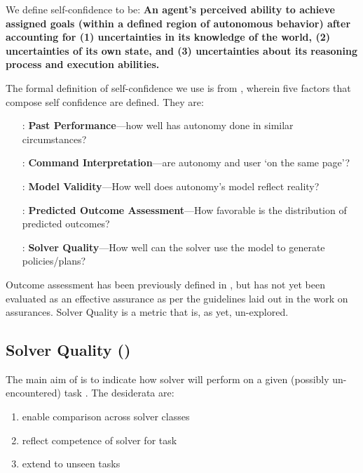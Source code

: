     We define self-confidence to be: \textbf{An agent's perceived ability to achieve assigned goals (within a defined region of autonomous behavior) after accounting for (1) uncertainties in its knowledge of the world, (2) uncertainties of its own state, and (3) uncertainties about its reasoning process and execution abilities.}

    The formal definition of self-confidence we use is from \cite{Aitken2016-cv}, wherein five factors that compose self confidence are defined. They are:

        \begin{itemize}
            \item [\xH{}:] \textbf{Past Performance}---how well has autonomy done in similar circumstances?
            \item [\xI{}:] \textbf{Command Interpretation}---are autonomy and user `on the same page'?
            \item [\xM{}:] \textbf{Model Validity}---How well does autonomy's model reflect reality?
            \item [\xP{}:] \textbf{Predicted Outcome Assessment}---How favorable is the distribution of predicted outcomes?
            \item [\xQ{}:] \textbf{Solver Quality}---How well can the solver use the model to generate policies/plans?
        \end{itemize}

    Outcome assessment has been previously defined in \cite{Aitken2016-cv}, but has not yet been evaluated as an effective assurance as per the guidelines laid out in the work on assurances. Solver Quality is a metric that is, as yet, un-explored.

\subsection{Solver Quality (\xQ)} \label{sec:SQ}
    The main aim of \xQ{} is to indicate how solver \solve{} will perform on a given (possibly un-encountered) task \task{}. The desiderata are:

    \begin{enumerate}[label=\textbf{D\arabic*}]
        \item enable comparison across solver classes \label{itm:d1}
        \item reflect competence of solver \solve{} for task \task{} \label{itm:d2}
        \item extend to unseen tasks \label{itm:d3}
    \end{enumerate}

